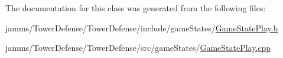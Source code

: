 The documentation for this class was generated from the following files\+:\begin{DoxyCompactItemize}
\item 
jamms/\+Tower\+Defense/\+Tower\+Defense/include/game\+States/\hyperlink{_game_state_play_8h}{Game\+State\+Play.\+h}\item 
jamms/\+Tower\+Defense/\+Tower\+Defense/src/game\+States/\hyperlink{_game_state_play_8cpp}{Game\+State\+Play.\+cpp}\end{DoxyCompactItemize}
